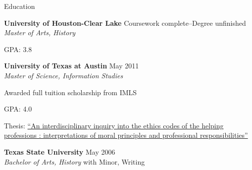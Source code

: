 \documentclass{resume} %
\begin{document}

\begin{rSection}{Education}
\raggedright
{\bf University of Houston-Clear Lake} \hfill{Coursework complete--Degree unfinished} \\
\textit{Master of Arts, History}
\begin{rSubsectionEd}
	\item GPA: 3.8
\end{rSubsectionEd}
{\bf University of Texas at Austin} \hfill {May 2011} \\ 
\textit{Master of Science, Information Studies}
\begin{rSubsectionEd}
	\item Awarded full tuition scholarship from IMLS
	\item GPA: 4.0
	\item Thesis: \href{http://hdl.handle.net/2152/ETD-UT-2011-05-3522}{``An interdisciplinary inquiry into the ethics codes of the helping professions : interpretations of moral principles and professional responsibilities''} \\	
\end{rSubsectionEd}

{\bf Texas State University} \hfill {May 2006} \\ 
\textit{Bachelor of Arts, History} with Minor, Writing 

\end{rSection}

\end{document}
